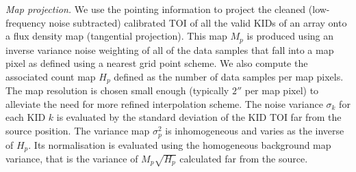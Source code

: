 %
%
%

\noindent \emph{Map projection.}
\label{se:map_projection}
We use the pointing information to project the cleaned (low-frequency
noise subtracted) calibrated TOI of all the valid KIDs of an array
onto a flux density map (tangential projection). This map $M_p$ is produced using an inverse
variance noise weighting of all of the data samples that fall into a map
pixel as defined using a nearest grid point scheme. We also compute
the associated count map $H_p$ defined as the number of data samples
per map pixels. The map resolution
is chosen small enough (typically $2''$ per map pixel) to alleviate
the need for more refined interpolation scheme. The noise variance
$\sigma_k$ for each KID $k$ is evaluated by the standard deviation of the
KID TOI far from the source position. 
{\lp The variance map $\sigma_p^2$ is inhomogeneous and varies as the
inverse of $H_p$. Its normalisation is evaluated using the
homogeneous background map variance, that is the
variance of $M_p\sqrt{H_p}$ calculated far from the source.}

